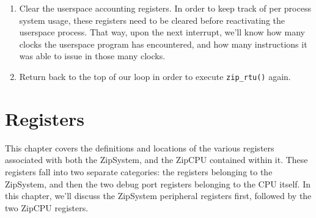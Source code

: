 \documentclass{gqtekspec}
\begin{document}
\begin{enumerate}
\item Clear the userspace accounting registers.  In order to keep track of
	per process system usage, these registers need to be cleared before
	reactivating the userspace process.  That way, upon the next
	interrupt, we'll know how many clocks the userspace program has
	encountered, and how many instructions it was able to issue in
	those many clocks. 

\item Return back to the top of our loop in order to execute {\tt zip\_rtu()}
	again.
\end{enumerate}


\chapter{Registers}\label{chap:regs}
This chapter covers the definitions and locations of the various registers
associated with both the ZipSystem, and the ZipCPU contained within it.
These registers fall into two separate categories: the registers belonging
to the ZipSystem, and then the two debug port registers belonging to the CPU
itself.  In this chapter, we'll discuss the ZipSystem peripheral registers
first, followed by the two ZipCPU registers.
\end{document}
